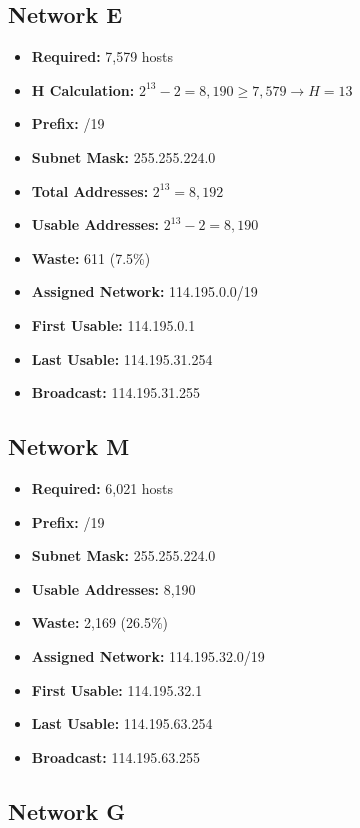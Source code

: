 \documentclass[12pt,a4paper]{report}
\begin{document}
\subsection{Network E}

\begin{itemize}
    \item \textbf{Required:} 7,579 hosts
    \item \textbf{H Calculation:} $2^{13} - 2 = 8,190 \geq 7,579 \rightarrow H = 13$
    \item \textbf{Prefix:} /19
    \item \textbf{Subnet Mask:} 255.255.224.0
    \item \textbf{Total Addresses:} $2^{13} = 8,192$
    \item \textbf{Usable Addresses:} $2^{13} - 2 = 8,190$
    \item \textbf{Waste:} 611 (7.5\%)
    \item \textbf{Assigned Network:} 114.195.0.0/19
    \item \textbf{First Usable:} 114.195.0.1
    \item \textbf{Last Usable:} 114.195.31.254
    \item \textbf{Broadcast:} 114.195.31.255
\end{itemize}

\subsection{Network M}

\begin{itemize}
    \item \textbf{Required:} 6,021 hosts
    \item \textbf{Prefix:} /19
    \item \textbf{Subnet Mask:} 255.255.224.0
    \item \textbf{Usable Addresses:} 8,190
    \item \textbf{Waste:} 2,169 (26.5\%)
    \item \textbf{Assigned Network:} 114.195.32.0/19
    \item \textbf{First Usable:} 114.195.32.1
    \item \textbf{Last Usable:} 114.195.63.254
    \item \textbf{Broadcast:} 114.195.63.255
\end{itemize}

\subsection{Network G}
\end{document}

